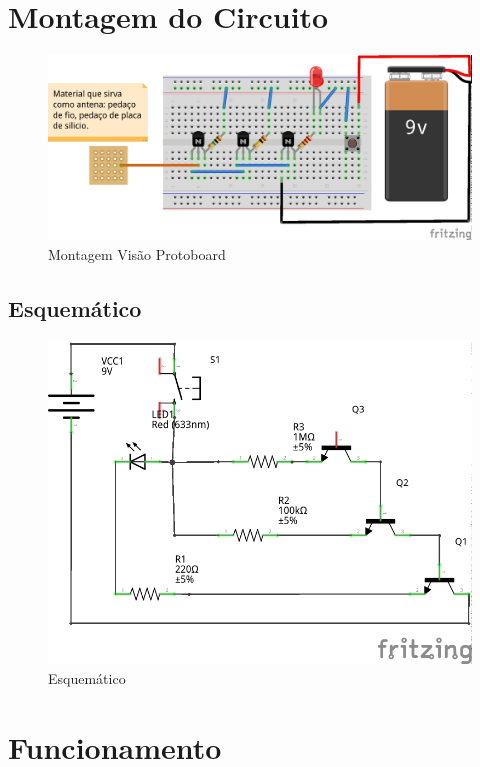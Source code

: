 \section{Montagem do Circuito}\label{montagem-do-circuito}

\begin{figure}[H]
    \includegraphics[scale=0.9]{img/non-contact-voltage-sensor_bb.jpg}
    \caption{Montagem Visão Protoboard}
\end{figure}

\subsection{Esquemático}\label{esquemuxe1tico}

\begin{figure}[H]
    \includegraphics[scale=1.6]{img/non-contact-voltage-sensor_Esquematico.jpg}
    \caption{Esquemático}
\end{figure}

\section{Funcionamento}\label{funcionamento}

